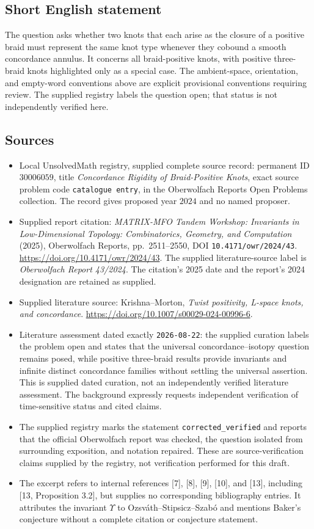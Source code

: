 \documentclass[11pt]{article}
\begin{document}
\subsection{Short English statement}
The question asks whether two knots that each arise as the closure of a positive braid must represent the same knot type whenever they cobound a smooth concordance annulus. It concerns all braid-positive knots, with positive three-braid knots highlighted only as a special case. The ambient-space, orientation, and empty-word conventions above are explicit provisional conventions requiring review. The supplied registry labels the question open; that status is not independently verified here.
\subsection{Sources}
\begin{itemize}
\item Local UnsolvedMath registry, supplied complete source record: permanent ID \(30006059\), title \emph{Concordance Rigidity of Braid-Positive Knots}, exact source problem code \texttt{catalogue entry}, in the Oberwolfach Reports Open Problems collection. The record gives proposed year \(2024\) and no named proposer.
\item Supplied report citation: \emph{MATRIX-MFO Tandem Workshop: Invariants in Low-Dimensional Topology: Combinatorics, Geometry, and Computation} (2025), Oberwolfach Reports, pp.\ 2511--2550, DOI \texttt{10.4171/owr/2024/43}. \url{https://doi.org/10.4171/owr/2024/43}. The supplied literature-source label is \emph{Oberwolfach Report 43/2024}. The citation's 2025 date and the report's 2024 designation are retained as supplied.
\item Supplied literature source: Krishna--Morton, \emph{Twist positivity, L-space knots, and concordance}. \url{https://doi.org/10.1007/s00029-024-00996-6}.
\item Literature assessment dated exactly \texttt{2026-08-22}: the supplied curation labels the problem open and states that the universal concordance--isotopy question remains posed, while positive three-braid results provide invariants and infinite distinct concordance families without settling the universal assertion. This is supplied dated curation, not an independently verified literature assessment. The background expressly requests independent verification of time-sensitive status and cited claims.
\item The supplied registry marks the statement \texttt{corrected\_verified} and reports that the official Oberwolfach report was checked, the question isolated from surrounding exposition, and notation repaired. These are source-verification claims supplied by the registry, not verification performed for this draft.
\item The excerpt refers to internal references [7], [8], [9], [10], and [13], including [13, Proposition 3.2], but supplies no corresponding bibliography entries. It attributes the invariant \(\Upsilon\) to Ozsv\'ath--Stipsicz--Szab\'o and mentions Baker's conjecture without a complete citation or conjecture statement.
\end{itemize}
\end{document}
